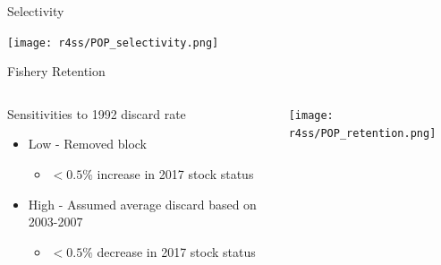 \documentclass[pdf]{beamer}\usepackage[]{graphicx}\usepackage[]{color}
\begin{document}
\begin{frame}{Selectivity}
  \begin{center}
    \texttt{[image: r4ss/POP\_selectivity.png]}
  \end{center}
\end{frame}

\begin{frame}{Fishery Retention}
\begin{columns}
  \begin{column}{0.4\textwidth}
      Sensitivities to 1992 discard rate
      \begin{itemize}
        \item Low - Removed block  
          \begin{itemize}
            \item $< 0.5\%$ increase in 2017 stock status
          \end{itemize}
        \item High - Assumed average discard based on 2003-2007 
          \begin{itemize}
            \item $< 0.5\%$ decrease in 2017 stock status
          \end{itemize}
      \end{itemize}
  \end{column}
  
  \begin{column}{0.6\textwidth}
  \begin{center}
    \texttt{[image: r4ss/POP\_retention.png]}
  \end{center}
  \end{column}
\end{columns}
\end{frame}
\end{document}
